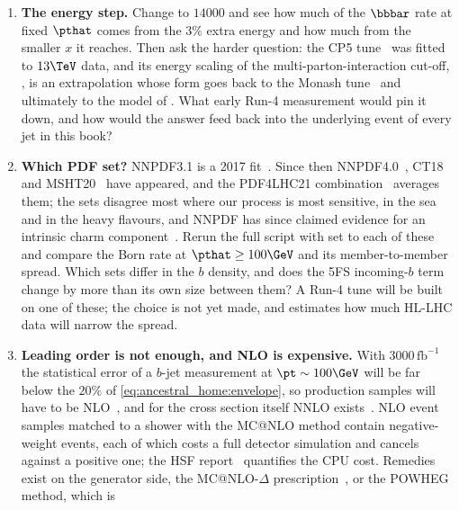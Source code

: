 \begin{enumerate}
  \item \textbf{The energy step.} Change  to $14000$ and see
    how much of the $\bbbar$ rate at fixed $\pthat$ comes from the $3\%$
    extra energy and how much from the smaller $x$ it reaches. Then ask the
    harder question: the CP5 tune~\cite{CMS:2019csb} was fitted to $13\TeV$
    data, and its energy scaling of the multi-parton-interaction cut-off,
    , is an extrapolation whose form
    goes back to the Monash tune~\cite{Skands:2014pea} and ultimately to the
    model of \cite{Sjostrand:1987su}. What early Run-4 measurement would pin
    it down, and how would the answer feed back into the underlying event of
    every jet in this book?
  \item \textbf{Which PDF set?} NNPDF3.1 is a 2017 fit~\cite{NNPDF:2017mvq}.
    Since then NNPDF4.0~\cite{NNPDF:2021njg}, CT18~\cite{Hou:2019efy} and
    MSHT20~\cite{Bailey:2020ooq} have appeared, and the PDF4LHC21
    combination~\cite{PDF4LHCWorkingGroup:2022cjn} averages them; the sets
    disagree most where our process is most sensitive, in the sea and in the
    heavy flavours, and NNPDF has since claimed evidence for an intrinsic
    charm component~\cite{Ball:2022qks}. Rerun the full script with
     set to each of these and compare the Born rate at
    $\pthat\ge100\GeV$ and its member-to-member spread. Which sets differ in
    the $b$ density, and does the 5FS incoming-$b$ term change by more than
    its own size between them? A Run-4 tune will be built on one of these;
    the choice is not yet made, and \cite{AbdulKhalek:2018rok} estimates how
    much HL-LHC data will narrow the spread.
  \item \textbf{Leading order is not enough, and NLO is expensive.} With
    $3000\,\mathrm{fb}^{-1}$ the statistical error of a $b$-jet measurement
    at $\pt\sim100\GeV$ will be far below the $20\%$ of
    \cref{eq:ancestral_home:envelope}, so production samples will have to
    be NLO~\cite{Nason:1987xz,Alwall:2014hca}, and for the cross section
    itself NNLO exists~\cite{Catani:2020kkl}. NLO event samples matched to a
    shower with the MC@NLO method contain negative-weight events, each of
    which costs a full detector simulation and cancels against a positive
    one; the HSF report~\cite{HSFPhysicsEventGeneratorWG:2020gxw} quantifies
    the CPU cost. Remedies exist on the generator side, the MC@NLO-$\Delta$
    prescription~\cite{Frederix:2020trv}, or the POWHEG method, which is

\end{enumerate}

